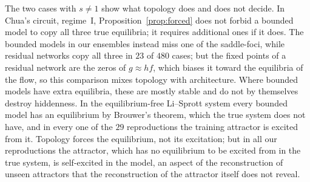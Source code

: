 \documentclass[aip,cha,reprint,amsmath,amssymb,longbibliography]{revtex4-2}
\theoremstyle{definition}
\begin{document}
The two cases with $s\neq1$ show what topology does and does not decide. In Chua's circuit, regime~I,
Proposition~\ref{prop:forced} does not forbid a bounded model to copy all three true equilibria; it requires additional ones
if it does. The bounded models in our ensembles instead miss one of the saddle-foci, while residual networks copy all three
in $23$ of $480$ cases; but the fixed points of a residual network are the zeros of $g\approx h f$, which biases it toward the
equilibria of the flow, so this comparison mixes topology with architecture. Where bounded models have extra equilibria,
these are mostly stable and do not by themselves destroy hiddenness. In the equilibrium-free Li--Sprott system every
bounded model has an equilibrium by Brouwer's theorem, which the true system does not have, and in every one of the $29$
reproductions the training attractor is excited from it. Topology forces the equilibrium, not its excitation; but in all our reproductions the attractor, which has
no equilibrium to be excited from in the true system, is self-excited in the model, an aspect of the reconstruction of
unseen attractors\cite{Rohm2021} that the reconstruction of the attractor itself does not reveal.
\end{document}
